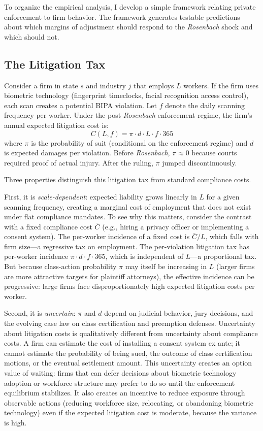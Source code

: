 \documentclass[12pt]{article}
\begin{document}
To organize the empirical analysis, I develop a simple framework relating private enforcement to firm behavior. The framework generates testable predictions about which margins of adjustment should respond to the \textit{Rosenbach} shock and which should not.

\subsection{The Litigation Tax}

Consider a firm in state $s$ and industry $j$ that employs $L$ workers. If the firm uses biometric technology (fingerprint timeclocks, facial recognition access control), each scan creates a potential BIPA violation. Let $f$ denote the daily scanning frequency per worker. Under the post-\textit{Rosenbach} enforcement regime, the firm's annual expected litigation cost is:
\begin{equation}
C(L, f) = \pi \cdot d \cdot L \cdot f \cdot 365
\label{eq:litcost}
\end{equation}
where $\pi$ is the probability of suit (conditional on the enforcement regime) and $d$ is expected damages per violation. Before \textit{Rosenbach}, $\pi \approx 0$ because courts required proof of actual injury. After the ruling, $\pi$ jumped discontinuously.

Three properties distinguish this litigation tax from standard compliance costs.

First, it is \textit{scale-dependent}: expected liability grows linearly in $L$ for a given scanning frequency, creating a marginal cost of employment that does not exist under flat compliance mandates. To see why this matters, consider the contrast with a fixed compliance cost $\bar{C}$ (e.g., hiring a privacy officer or implementing a consent system). The per-worker incidence of a fixed cost is $\bar{C}/L$, which falls with firm size---a regressive tax on employment. The per-violation litigation tax has per-worker incidence $\pi \cdot d \cdot f \cdot 365$, which is independent of $L$---a proportional tax. But because class-action probability $\pi$ may itself be increasing in $L$ (larger firms are more attractive targets for plaintiff attorneys), the effective incidence can be progressive: large firms face disproportionately high expected litigation costs per worker.

Second, it is \textit{uncertain}: $\pi$ and $d$ depend on judicial behavior, jury decisions, and the evolving case law on class certification and preemption defenses. Uncertainty about litigation costs is qualitatively different from uncertainty about compliance costs. A firm can estimate the cost of installing a consent system ex ante; it cannot estimate the probability of being sued, the outcome of class certification motions, or the eventual settlement amount. This uncertainty creates an option value of waiting: firms that can defer decisions about biometric technology adoption or workforce structure may prefer to do so until the enforcement equilibrium stabilizes. It also creates an incentive to reduce exposure through observable actions (reducing workforce size, relocating, or abandoning biometric technology) even if the expected litigation cost is moderate, because the variance is high.
\end{document}
